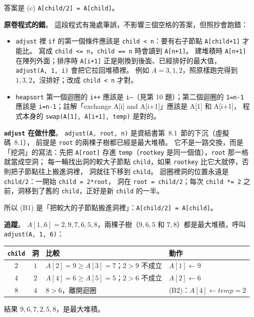 \begin{pastsoln}
答案是 (c) \texttt{A[child/2] = A[child]}。

\textbf{原卷程式的錯}。 這段程式有幾處筆誤，不影響三個空格的答案，但照抄會跑錯：
\begin{itemize}
\item \texttt{adjust} 裡 \texttt{if} 的第一個條件應該是 \texttt{child < n}：要有右子節點
\texttt{A[child+1]} 才能比。 寫成 \texttt{child <= n}，\texttt{child == n} 時會讀到 \texttt{A[n+1]}。
建堆積時 \texttt{A[n+1]} 在陣列外面；排序時 \texttt{A[i+1]} 正是剛換到後面、已經排好的最大值，
\texttt{adjust(A, 1, i)} 會把它拉回堆積裡。 例如 $A = 3, 1, 2$，照原樣跑完得到 $1, 3, 2$，沒排好；改成
\texttt{child < n} 才對。
\item \texttt{heapsort} 第一個迴圈的 \texttt{i++} 應該是 \texttt{i--}（見第 10 題）；第二個迴圈的
\texttt{1=n-1} 應該是 \texttt{i=n-1}；註解「exchange A[i] and A[i+1]」應該是 A[1] 和 A[i+1]，
程式本身的 \texttt{swap(A[1], A[i+1], temp)} 是對的。
\end{itemize}

\textbf{\texttt{adjust} 在做什麼}。 \texttt{adjust(A, root, n)} 是資結書第~8.1~節的下沉（虛擬碼~8.1），
前提是 \texttt{root} 的兩棵子樹都已經是最大堆積。 它不是一路交換，而是「挖洞」的寫法：先把
\texttt{A[root]} 存進 \texttt{temp}（\texttt{rootkey} 是同一個值），\texttt{root} 那一格就當成空洞；
每一輪找出洞的較大子節點 \texttt{child}，如果 \texttt{rootkey} 比它大就停，否則把子節點往上搬進洞裡，
洞就往下移到 \texttt{child}。 迴圈裡洞的位置永遠是 \texttt{child/2}：一開始 \texttt{child = 2*root}，
洞在 \texttt{root = child/2}；每次 \texttt{child *= 2} 之前，洞移到了舊的 \texttt{child}，正好是新
\texttt{child} 的一半。

所以 (B1) 是「把較大的子節點搬進洞裡」：\texttt{A[child/2] = A[child]}。

\textbf{追蹤}。 $A[1..6] = 2, 9, 7, 6, 5, 8$，兩棵子樹（$9, 6, 5$ 和 $7, 8$）都是最大堆積，呼叫
\texttt{adjust(A, 1, 6)}：
\begin{center}
\small
\begin{tabular}{ccll}
\toprule
\texttt{child} & 洞 & 比較 & 動作 \\
\midrule
$2$ & $1$ & $A[2] = 9 \ge A[3] = 7$；$2 > 9$ 不成立 & $A[1] \gets 9$ \\
$4$ & $2$ & $A[4] = 6 \ge A[5] = 5$；$2 > 6$ 不成立 & $A[2] \gets 6$ \\
$8$ & $4$ & $8 > 6$，離開迴圈 & (B2)：$A[4] \gets \mathit{temp} = 2$ \\
\bottomrule
\end{tabular}
\end{center}
結果 $9, 6, 7, 2, 5, 8$，是最大堆積。


\end{pastsoln}
